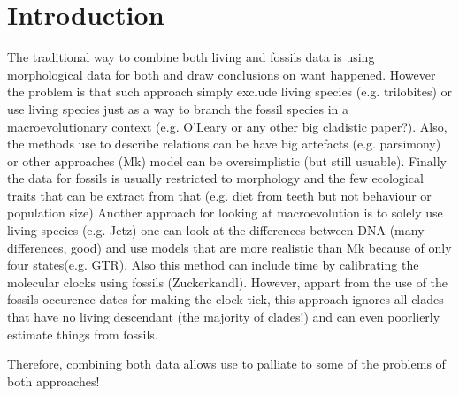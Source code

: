 \chapter{Introduction}
\label{chap:introduction}



The traditional way to combine both living and fossils data is using morphological data for both and draw conclusions on want happened.
However the problem is that such approach simply exclude living species (e.g. trilobites) or use living species just as a way to branch the fossil species in a macroevolutionary context (e.g. O'Leary or any other big cladistic paper?).
Also, the methods use to describe relations can be have big artefacts (e.g. parsimony) or other approaches (Mk) model can be oversimplistic (but still usuable).
Finally the data for fossils is usually restricted to morphology and the few ecological traits that can be extract from that (e.g. diet from teeth but not behaviour or population size)
Another approach for looking at macroevolution is to solely use living species (e.g. Jetz) one can look at the differences between DNA (many differences, good) and use models that are more realistic than Mk because of only four states(e.g. GTR).
Also this method can include time by calibrating the molecular clocks using fossils (Zuckerkandl).
However, appart from the use of the fossils occurence dates for making the clock tick, this approach ignores all clades that have no living descendant (the majority of clades!) and can even poorlierly estimate things from fossils.

Therefore, combining both data allows use to palliate to some of the problems of both approaches!




